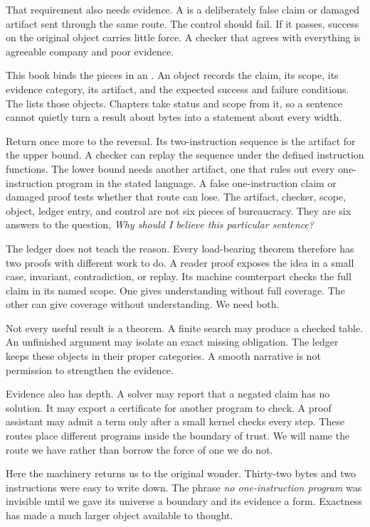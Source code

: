 That requirement also needs evidence. A  is a
deliberately false claim or damaged artifact sent through the same route. The
control should fail. If it passes, success on the original object carries
little force. A checker that agrees with everything is agreeable company and
poor evidence.

This book binds the pieces in an . An object records the
claim, its scope, its evidence category, its artifact, and the expected
success and failure conditions. The  lists those objects.
Chapters take status and scope from it, so a sentence cannot quietly turn a
result about bytes into a statement about every width.

Return once more to the reversal. Its two-instruction sequence is the
artifact for the upper bound. A checker can replay the sequence under the
defined instruction functions. The lower bound needs another artifact, one
that rules out every one-instruction program in the stated language. A false
one-instruction claim or damaged proof tests whether that route can lose. The
artifact, checker, scope, object, ledger entry, and control are not six pieces
of bureaucracy. They are six answers to the question, \emph{Why should I
believe this particular sentence?}

The ledger does not teach the reason. Every load-bearing theorem therefore
has two proofs with different work to do. A reader proof exposes the idea in
a small case, invariant, contradiction, or replay. Its machine counterpart
checks the full claim in its named scope. One gives understanding without full
coverage. The other can give coverage without understanding. We need both.

Not every useful result is a theorem. A finite search may produce a checked
table. An unfinished argument may isolate an exact missing obligation. The
ledger keeps these objects in their proper categories. A smooth narrative is
not permission to strengthen the evidence.

Evidence also has depth. A solver may report that a negated claim has no
solution. It may export a certificate for another program to check. A proof
assistant may admit a term only after a small kernel checks every step. These
routes place different programs inside the boundary of trust. We will name
the route we have rather than borrow the force of one we do not.

Here the machinery returns us to the original wonder. Thirty-two bytes and
two instructions were easy to write down. The phrase \emph{no one-instruction
program} was invisible until we gave its universe a boundary and its evidence
a form. Exactness has made a much larger object available to thought.

